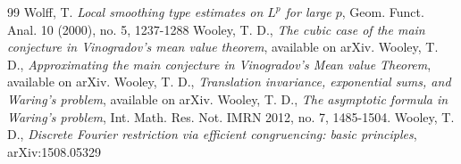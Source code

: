 \documentclass[amssymb,amsfonts,12pt]{amsart}
\def\R{{\mathbb R}}
\begin{document}
\begin{thebibliography}{99}
 Wolff, T. {\em Local smoothing type estimates on $L^p$ for large $p$}, Geom. Funct. Anal. 10 (2000), no. 5, 1237-1288
 Wooley, T. D., {\em  The cubic case of the main conjecture in Vinogradov's mean value theorem}, available on arXiv.
 Wooley, T. D., {\em  Approximating the main conjecture in Vinogradov's Mean value Theorem}, available on arXiv.
 Wooley, T. D., {\em  Translation invariance, exponential sums, and Waring’s problem}, available on arXiv.
 Wooley, T. D., {\em  The asymptotic formula in Waring's problem},
Int. Math. Res. Not. IMRN 2012, no. 7, 1485-1504.
 Wooley, T. D., {\em Discrete Fourier restriction via efficient congruencing: basic principles}, arXiv:1508.05329  
\end{thebibliography}
\end{document}

